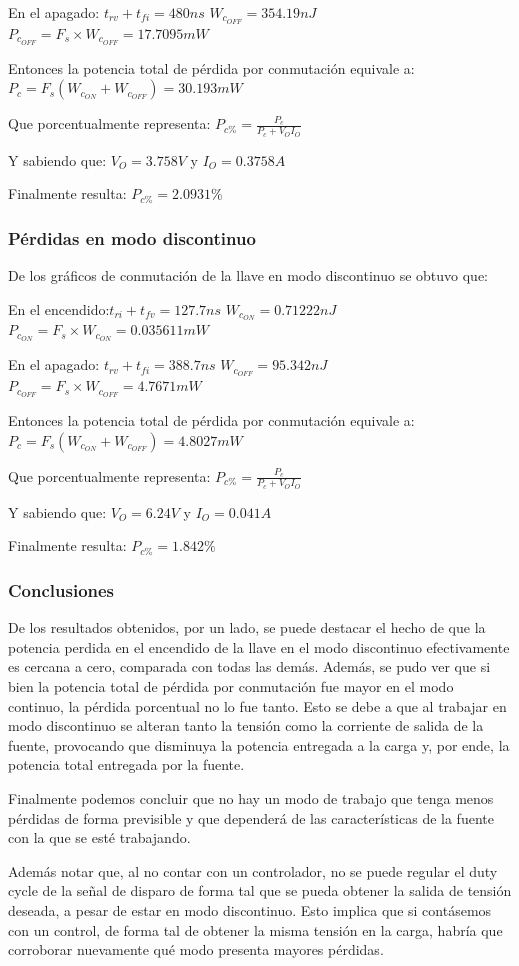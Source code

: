 \documentclass[e4_tp1_main.tex]{subfiles}
\begin{document}
	En el apagado: $t_{rv}+t_{fi}=480ns$ \quad\quad $W_{c_{OFF}}=354.19nJ$ \quad\quad $P_{c_{OFF}}=F_s\times W_{c_{OFF}}=17.7095mW$
	
	Entonces la potencia total de pérdida por conmutación equivale a: $P_c=F_s(W_{c_{ON}}+W_{c_{OFF}})=30.193mW$
	
	Que porcentualmente representa: $P_{c\%}=\frac{P_c}{P_c+V_OI_O}$
	
	Y sabiendo que: $V_O=3.758V$ y $I_O=0.3758A$
	
	Finalmente resulta:	$P_{c\%}=2.0931\%$
	
	
	
	\subsubsection{Pérdidas en modo discontinuo}
	De los gráficos de conmutación de la llave en modo discontinuo se obtuvo que:
	
	En el encendido:$t_{ri}+t_{fv}=127.7ns$ \quad $W_{c_{ON}}=0.71222nJ$\quad \quad$P_{c_{ON}}=F_s\times W_{c_{ON}}=0.035611mW$
		
	En el apagado: $t_{rv}+t_{fi}=388.7ns$ \quad\quad $W_{c_{OFF}}=95.342nJ$\quad\quad $P_{c_{OFF}}=F_s\times W_{c_{OFF}}=4.7671mW$
	
	Entonces la potencia total de pérdida por conmutación equivale a: $P_c=F_s(W_{c_{ON}}+W_{c_{OFF}})=4.8027mW$
	
	Que porcentualmente representa: $P_{c\%}=\frac{P_c}{P_c+V_OI_O}$	

	Y sabiendo que: $V_O=6.24V$ y $I_O=0.041A$
	
	Finalmente resulta: $P_{c\%}=1.842\%$
	
	\subsubsection{Conclusiones}
	De los resultados obtenidos, por un lado, se puede destacar el hecho de que la potencia perdida en el encendido de la llave en el modo discontinuo  efectivamente es cercana a cero, comparada con todas las demás. Además, se pudo ver que si bien la potencia total de pérdida por conmutación fue mayor en el modo continuo, la pérdida porcentual no lo fue tanto. Esto se debe a que al trabajar en modo discontinuo se alteran tanto la tensión como la corriente de salida de la fuente, provocando que disminuya la potencia entregada a la carga y, por ende, la potencia total entregada por la fuente. 
	
	Finalmente podemos concluir que no hay un modo de trabajo que tenga menos pérdidas de forma previsible y que dependerá de las características de la fuente con la que se esté trabajando. 
	
	Además notar que, al no contar con un controlador, no se puede regular el duty cycle de la señal de disparo de forma tal que se pueda obtener la salida de tensión deseada, a pesar de estar en modo discontinuo. Esto implica que si contásemos con un control, de forma tal de obtener la misma tensión en la carga, habría que corroborar nuevamente qué modo presenta mayores pérdidas.
	
\end{document}
